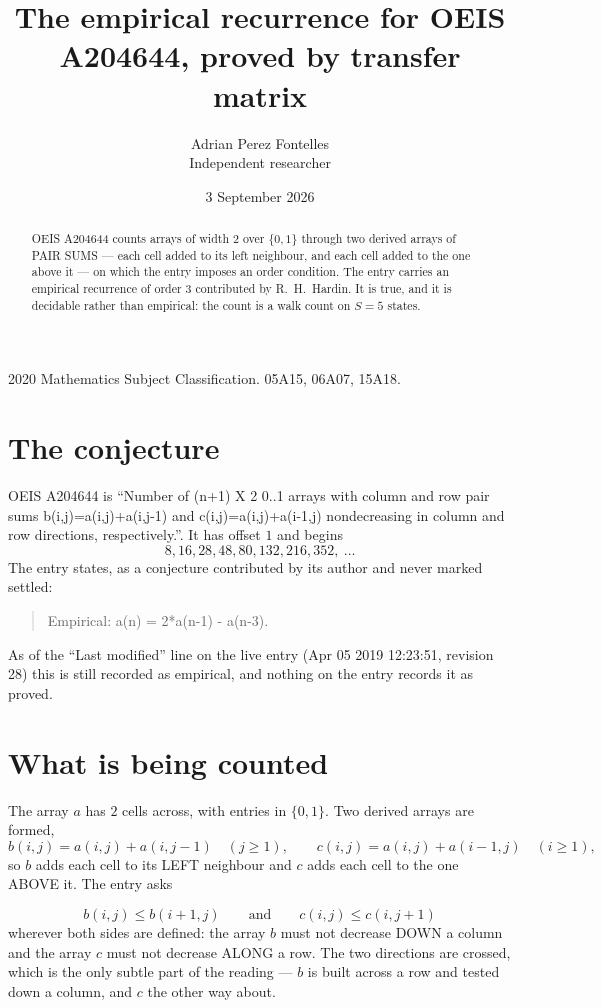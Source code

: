 \documentclass[11pt,a4paper]{article}
\title{The empirical recurrence for OEIS A204644, proved by transfer matrix}
\author{Adrian Perez Fontelles\\ \small Independent researcher}
\date{3 September 2026}
\theoremstyle{plain}
\theoremstyle{definition}
\begin{document}
\maketitle

\begin{abstract}
OEIS A204644 counts arrays of width $2$ over $\{0,1\}$ through two derived arrays of PAIR SUMS ---
each cell added to its left neighbour, and each cell added to the one above it --- on which the
entry imposes an order condition. The entry carries an empirical recurrence of order $3$
contributed by R.~H.~Hardin. It is true, and it is decidable rather than empirical: the count is
a walk count on $S=5$ states.
\end{abstract}

\noindent\small 2020 Mathematics Subject Classification. 05A15, 06A07, 15A18.\normalsize

\section{The conjecture}

OEIS A204644 is ``Number of (n+1) X 2 0..1 arrays with column and row pair sums b(i,j)=a(i,j)+a(i,j-1) and c(i,j)=a(i,j)+a(i-1,j) nondecreasing in column and row directions, respectively.''. It has offset $1$ and begins
\[
8, 16, 28, 48, 80, 132, 216, 352,\ \dots
\]
The entry states, as a conjecture contributed by its author and never marked settled:
\begin{quote}
Empirical: a(n) = 2*a(n-1) - a(n-3).
\end{quote}
As of the ``Last modified'' line on the live entry (Apr 05 2019 12:23:51, revision 28) this is still
recorded as empirical, and nothing on the entry records it as proved.

\section{What is being counted}

The array $a$ has $2$ cells across, with entries in $\{0,1\}$. Two derived arrays are formed,
\[
b(i,j)=a(i,j)+a(i,j-1)\quad(j\ge1),\qquad c(i,j)=a(i,j)+a(i-1,j)\quad(i\ge1),
\]
so $b$ adds each cell to its LEFT neighbour and $c$ adds each cell to the one ABOVE it. The
entry asks

\[
b(i,j)\le b(i{+}1,j)\qquad\text{and}\qquad c(i,j)\le c(i,j{+}1)
\]
wherever both sides are defined: the array $b$ must not decrease DOWN a column and the array
$c$ must not decrease ALONG a row. The two directions are crossed, which is the only subtle
part of the reading --- $b$ is built across a row and tested down a column, and $c$ the other
way about.
\end{document}
